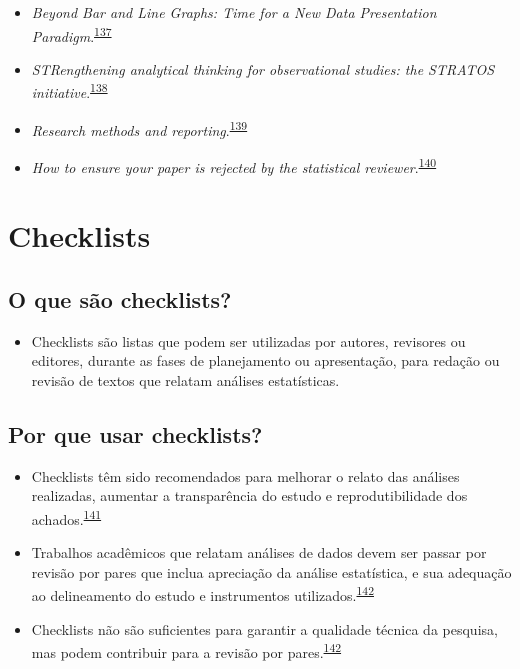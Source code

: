 \documentclass[
]{book}
\providecommand{\tightlist}{%
  \setlength{\itemsep}{0pt}\setlength{\parskip}{0pt}}
\begin{document}
\begin{itemize}
\item
  \emph{Beyond Bar and Line Graphs: Time for a New Data Presentation Paradigm}.\textsuperscript{\protect\hyperlink{ref-Weissgerber2015}{137}}
\item
  \emph{STRengthening analytical thinking for observational studies: the STRATOS initiative}.\textsuperscript{\protect\hyperlink{ref-Sauerbrei2014}{138}}
\item
  \emph{Research methods and reporting}.\textsuperscript{\protect\hyperlink{ref-groves2008}{139}}
\item
  \emph{How to ensure your paper is rejected by the statistical reviewer}.\textsuperscript{\protect\hyperlink{ref-stratton2005}{140}}
\end{itemize}

\hypertarget{checklists}{%
\section{Checklists}\label{checklists}}

\hypertarget{o-que-suxe3o-checklists}{%
\subsection{O que são checklists?}\label{o-que-suxe3o-checklists}}

\begin{itemize}
\tightlist
\item
  Checklists são listas que podem ser utilizadas por autores, revisores ou editores, durante as fases de planejamento ou apresentação, para redação ou revisão de textos que relatam análises estatísticas.
\end{itemize}

\hypertarget{por-que-usar-checklists}{%
\subsection{Por que usar checklists?}\label{por-que-usar-checklists}}

\begin{itemize}
\item
  Checklists têm sido recomendados para melhorar o relato das análises realizadas, aumentar a transparência do estudo e reprodutibilidade dos achados.\textsuperscript{\protect\hyperlink{ref-Gardner1986}{141}}
\item
  Trabalhos acadêmicos que relatam análises de dados devem ser passar por revisão por pares que inclua apreciação da análise estatística, e sua adequação ao delineamento do estudo e instrumentos utilizados.\textsuperscript{\protect\hyperlink{ref-Mascha2017}{142}}
\item
  Checklists não são suficientes para garantir a qualidade técnica da pesquisa, mas podem contribuir para a revisão por pares.\textsuperscript{\protect\hyperlink{ref-Mascha2017}{142}}
\end{itemize}
\end{document}
